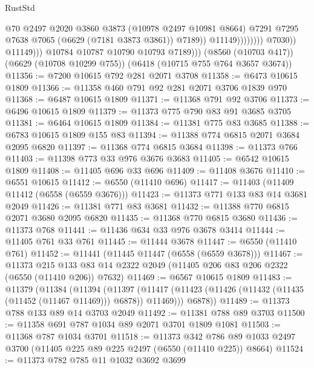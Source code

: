 \begin{lexlean}{RustStd}
\begin{coremodule}
                                        @70
                                        @2497
                                        @2020
                                        @3860
                                        @3873
                                        (@10978 @2497 @10981 @8664)
                                        @7291
                                        @7295
                                        @7638
                                        @7065
                                        (@6629 (@7181 @3873 @3861))
                                        @7189))
                                    @11149))))))))
                    @7030))
                @11149)))
          @10784
          @10787
          @10790
          @10793
          @7189)))
    (@8560 (@10703 @417))
    (@6629 (@10708 @10299 @755))
    (@6418 (@10715 @755 @764 @3657 @3674))
@11356 := @7200 @10615 @792 @281 @2071 @3708
@11358 := @6473 @10615 @1809
@11366 := @11358 @460 @791 @92 @281 @2071 @3706 @1839 @970
@11368 := @6487 @10615 @1809
@11371 := @11368 @791 @92 @3706
@11373 := @6496 @10615 @1809
@11379 := @11373 @775 @790 @83 @91 @3685 @3705
@11381 := @6464 @10615 @1809
@11384 := @11381 @775 @83 @3685
@11388 := @6783 @10615 @1809 @155 @83
@11394 := @11388 @774 @6815 @2071 @3684 @2095 @6820
@11397 := @11368 @774 @6815 @3684
@11398 := @11373 @766
@11403 := @11398 @773 @33 @976 @3676 @3683
@11405 := @6542 @10615 @1809
@11408 := @11405 @696 @33 @696
@11409 := @11408 @3676
@11410 := @6551 @10615
@11412 := @6550 (@11410 @696)
@11417 := @11403 (@11409 @11412 (@6558 (@6559 @3676)))
@11423 := @11373 @771 @133 @83 @14 @3681 @2049
@11426 := @11381 @771 @83 @3681
@11432 := @11388 @770 @6815 @2071 @3680 @2095 @6820
@11435 := @11368 @770 @6815 @3680
@11436 := @11373 @768
@11441 := @11436 @634 @33 @976 @3678 @3414
@11444 := @11405 @761 @33 @761
@11445 := @11444 @3678
@11447 := @6550 (@11410 @761)
@11452 := @11441 (@11445 @11447 (@6558 (@6559 @3678)))
@11467 := @11373
    @215
    @133
    @83
    @14
    @2322
    @2049
    (@11405 @206 @83 @206 @2322 (@6550 (@11410 @206)) @7632)
@11469 := @6567 @10615 @1809
@11483 := @11379
    (@11384
      (@11394
        (@11397 (@11417 (@11423 (@11426 (@11432 (@11435 (@11452 (@11467 @11469))) @6878)) @11469)))
        @6878))
@11489 := @11373 @788 @133 @89 @14 @3703 @2049
@11492 := @11381 @788 @89 @3703
@11500 := @11358 @691 @787 @1034 @89 @2071 @3701 @1809 @1081
@11503 := @11368 @787 @1034 @3701
@11518 := @11373
    @342
    @786
    @89
    @1033
    @2497
    @3700
    (@11405 @225 @89 @225 @2497 (@6550 (@11410 @225)) @8664)
@11524 := @11373 @782 @785 @11 @1032 @3692 @3699

\end{coremodule}
\end{lexlean}
